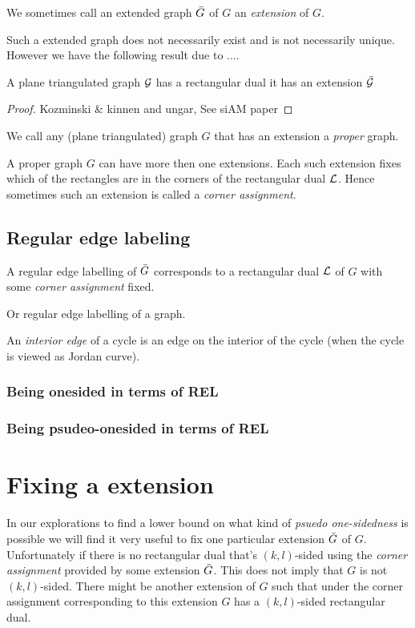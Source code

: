 We sometimes call an extended graph $\bar{G}$ of $G$ an \emph{extension} of $G$.

Such a extended graph does not necessarily exist and is not necessarily unique.  %
However we have the following result due to .... %

\begin{thrm}
A plane triangulated graph $\mathcal{G}$ has a rectangular dual \ifftext it has an extension $\bar{\mathcal{G}}$
\end{thrm}

\begin{proof}
Kozminski \& kinnen and ungar, See siAM paper %
\end{proof}

We call any (plane triangulated) graph $G$ that has an extension a \emph{proper} graph.

A proper graph $G$ can have more then one extensions. Each such extension fixes which of the rectangles are in the corners of the rectangular dual $\mathcal{L}$. Hence sometimes such an extension is called a \emph{corner assignment}.


\subsection{Regular edge labeling}
A regular edge labelling  of $\bar{G}$ corresponds to a rectangular dual $\mathcal{L}$ of $G$ with some \emph{corner assignment} fixed. %

Or regular edge labelling of a graph.


An \emph{interior edge} of a cycle is an edge on the interior of the cycle (when the cycle is viewed as Jordan curve).


\subsubsection{Being onesided in terms of REL}

\subsubsection{Being psudeo-onesided in terms of REL}

\section{Fixing a extension}
In our explorations to find a lower bound on what kind of \emph{psuedo one-sidedness} is possible we will find it very useful to fix one particular extension $\bar{G}$ of $G$. Unfortunately if there is no rectangular dual that’s $(k,l)$-sided using the \emph{corner assignment} provided by some extension $\bar{G}$. This does not imply that $G$ is not $(k,l)$-sided. There might be another extension of $G$ such that under the corner assignment corresponding to this extension $G$ has a $(k,l)$-sided rectangular dual.

